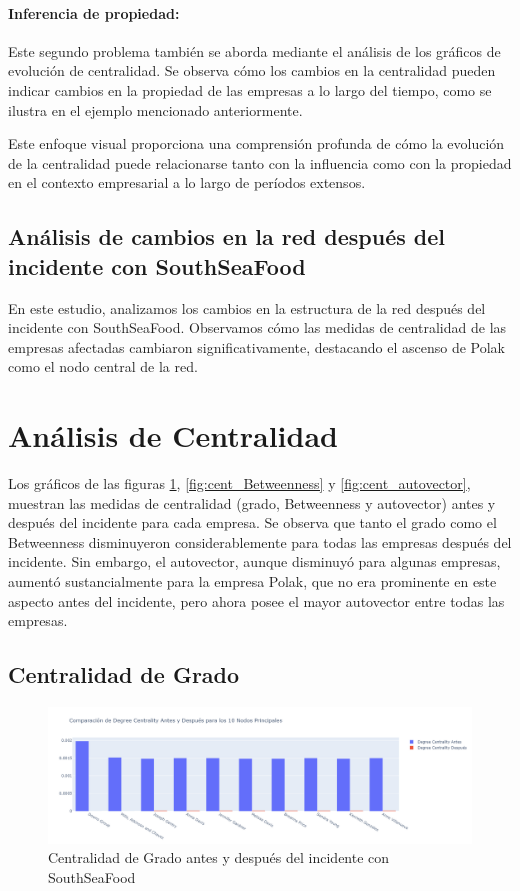 \documentclass[11pt,spanish,a4paper]{article}
\begin{document}
\paragraph{Inferencia de propiedad:}
Este segundo problema también se aborda mediante el análisis de los gráficos de evolución de centralidad. Se observa cómo los cambios en la centralidad pueden indicar cambios en la propiedad de las empresas a lo largo del tiempo, como se ilustra en el ejemplo mencionado anteriormente.

Este enfoque visual proporciona una comprensión profunda de cómo la evolución de la centralidad puede relacionarse tanto con la influencia como con la propiedad en el contexto empresarial a lo largo de períodos extensos.

\subsection{Análisis de cambios en la red después del incidente con SouthSeaFood}

En este estudio, analizamos los cambios en la estructura de la red después del incidente con SouthSeaFood. Observamos cómo las medidas de centralidad de las empresas afectadas cambiaron significativamente, destacando el ascenso de Polak como el nodo central de la red.

\section{Análisis de Centralidad}

Los gráficos de las figuras \ref{fig:cent_grado}, \ref{fig:cent_Betweenness} y \ref{fig:cent_autovector}, muestran las medidas de centralidad (grado, Betweenness y autovector) antes y después del incidente para cada empresa. Se observa que tanto el grado como el Betweenness disminuyeron considerablemente para todas las empresas después del incidente. Sin embargo, el autovector, aunque disminuyó para algunas empresas, aumentó sustancialmente para la empresa Polak, que no era prominente en este aspecto antes del incidente, pero ahora posee el mayor autovector entre todas las empresas.

\subsection{Centralidad de Grado}

\begin{figure}[H]
    \centering
    \includegraphics[width=0.8\linewidth]{graphs/degree_centrality_after_before_southseafood_top10.png}
    \caption{Centralidad de Grado antes y después del incidente con SouthSeaFood}
    \label{fig:cent_grado}
\end{figure}
\end{document}
